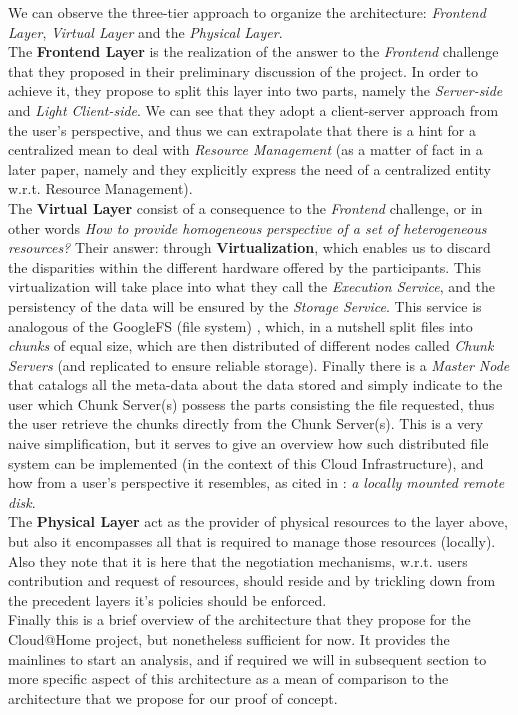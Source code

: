 \documentclass[11pt]{amsart}
\begin{document}
	We can observe the three-tier approach to organize the architecture: \emph{Frontend Layer}, \emph{Virtual Layer} 
	and the \emph{Physical Layer}.
	\\
	The \textbf{Frontend Layer} is the realization of the answer to the \emph{Frontend} challenge 
	that they proposed in their preliminary discussion of the project. In order to achieve it, 
	they propose to split this layer into two parts, namely the \emph{Server-side} and \emph{Light 
	Client-side}. We can see that they adopt a client-server approach from the user's perspective, 
	and thus we can extrapolate that there is a hint for a centralized mean to deal with \emph{
	Resource Management} (as a matter of fact in a later paper, namely \cite{cathome6} and \cite{cathome9} 
	they explicitly express the need of a centralized entity w.r.t. Resource Management). 
	\\
	The \textbf{Virtual Layer} consist of a consequence to the \emph{Frontend} challenge, or in 
	other words \emph{How to provide homogeneous perspective of a set of heterogeneous resources?} 
	Their answer: through \textbf{Virtualization}, which enables us to discard the disparities within 
	the different hardware offered by the participants. This virtualization will take place into what 
	they call the \emph{Execution Service}, and the persistency of the data will be ensured by the \emph{
	Storage Service}. This service is analogous of the GoogleFS (file system) \cite{gfs}, which, in a nutshell 
	split files into \emph{chunks} of equal size, which are then distributed of different nodes called 
	\emph{Chunk Servers} (and replicated to ensure reliable storage). Finally there is a \emph{Master 
	Node} that catalogs all the meta-data about the data stored and simply indicate to the user which 
	Chunk Server(s) possess the parts consisting the file requested, thus the user retrieve the chunks 
	directly from the Chunk Server(s). This is a very naive simplification, but it serves to give an 
	overview how such distributed file system can be implemented (in the context of this Cloud 
	Infrastructure), and how from a user's perspective it resembles, as cited in \cite{cathome}:
	\emph{a locally mounted remote disk}.
	\\
	The \textbf{Physical Layer} act as the provider of physical resources to the layer above, but 
	also it encompasses all that is required to manage those resources (locally). Also they note that 
	it is here that the negotiation mechanisms, w.r.t. users contribution and request of resources,
	should reside and by trickling down from the precedent layers it's policies should be enforced.
	\\
	Finally this is a brief overview of the architecture that they propose for the Cloud@Home project, 
	but nonetheless sufficient for now. It provides the mainlines to start an analysis, and if required 
	we will in subsequent section to more specific aspect of this architecture as a mean of comparison 
	to the architecture that we propose for our proof of concept.
	
\end{document}
